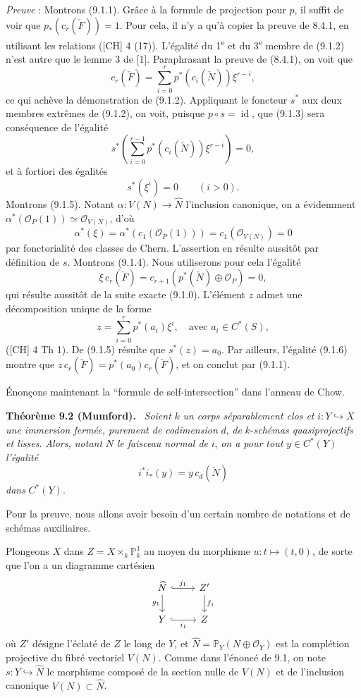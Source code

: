 \documentclass[11pt]{article}
\newenvironment{statement}[1]{\par\medskip\noindent\textbf{#1.}\ }{\par\medskip}
\begin{document}
\emph{Preuve} : Montrons (9.1.1). Grâce à la formule de projection pour $p$, il suffit de voir que $p_*(c_r(\check F))=1$. Pour cela, il n'y a qu'à copier la preuve de 8.4.1, en utilisant les relations ([CH] 4 (17)). L'égalité du 1\textsuperscript{e} et du 3\textsuperscript{e} membre de (9.1.2) n'est autre que le lemme 3 de [1]. Paraphrasant la preuve de (8.4.1), on voit que
\[
c_r(\check F)=\sum_{i=0}^r p^*(c_i(\check N))\xi^{r-i},
\tag*{(9.1.2) bis}
\]
ce qui achève la démonstration de (9.1.2). Appliquant le foncteur $s^*$ aux deux membres extrêmes de (9.1.2), on voit, puisque $p\circ s=\operatorname{id}$, que (9.1.3) sera conséquence de l'égalité
\[
s^*\left(\sum_{i=0}^{r-1}p^*(c_i(\check N))\xi^{r-i}\right)=0,
\]
et à fortiori des égalités
\[
s^*(\xi^i)=0\qquad(i>0).
\tag{9.1.5}
\]
Montrons (9.1.5). Notant $\alpha:V(N)\to\widehat N$ l'inclusion canonique, on a évidemment $\alpha^*(\mathcal O_P(1))\simeq\mathcal O_{V(N)}$, d'où
\[
\alpha^*(\xi)=\alpha^*(c_1(\mathcal O_P(1)))=c_1(\mathcal O_{V(N)})=0
\]
par fonctorialité des classes de Chern. L'assertion en résulte aussitôt par définition de $s$. Montrons (9.1.4). Nous utiliserons pour cela l'égalité
\[
\xi\,c_r(\check F)=c_{r+1}(p^*(\check N)\oplus\mathcal O_P)=0,
\tag{9.1.6}
\]
qui résulte aussitôt de la suite exacte (9.1.0). L'élément $z$ admet une décomposition unique de la forme
\[
z=\sum_{i=0}^r p^*(a_i)\xi^i,\quad\text{avec }a_i\in C^*(S),
\]
([CH] 4 Th 1). De (9.1.5) résulte que $s^*(z)=a_0$. Par ailleurs, l'égalité (9.1.6) montre que $z\,c_r(\check F)=p^*(a_0)c_r(\check F)$, et on conclut par (9.1.1).

Énonçons maintenant la ``formule de self-intersection'' dans l'anneau de Chow.

\begin{statement}{Théorème 9.2 (Mumford)}
\emph{Soient} $k$ \emph{un corps séparablement clos et} $i:Y\hookrightarrow X$ \emph{une immersion fermée, purement de codimension} $d$, \emph{de} $k$-\emph{schémas quasiprojectifs et lisses}. \emph{Alors, notant} $N$ \emph{le faisceau normal de} $i$, \emph{on a pour tout} $y\in C^*(Y)$ \emph{l'égalité}
\[
i^*i_*(y)=y\,c_d(\check N)
\]
\emph{dans} $C^*(Y)$.
\end{statement}

Pour la preuve, nous allons avoir besoin d'un certain nombre de notations et de schémas auxiliaires.

Plongeons $X$ dans $Z=X\times_k\mathbb P^1_k$ au moyen du morphisme $u:t\mapsto(t,0)$, de sorte que l'on a un diagramme cartésien
\[
\begin{tikzcd}
\widehat N \arrow[r,hook,"j_1"] \arrow[d,"g_1"'] & Z' \arrow[d,"f_1"]\\
Y \arrow[r,hook,"i_1"'] & Z
\end{tikzcd}
\]
où $Z'$ désigne l'éclaté de $Z$ le long de $Y$, et $\widehat N=\mathbb P_Y(N\oplus\mathcal O_Y)$ est la complétion projective du fibré vectoriel $V(N)$. Comme dans l'énoncé de 9.1, on note $s:Y\hookrightarrow\widehat N$ le morphisme composé de la section nulle de $V(N)$ et de l'inclusion canonique $V(N)\subset\widehat N$.
\end{document}
